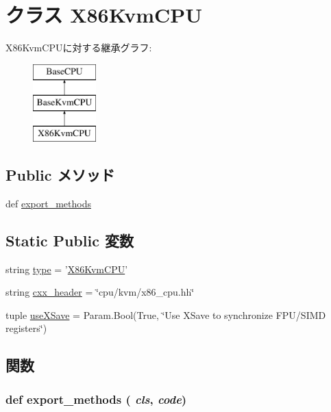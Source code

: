 \hypertarget{classX86KvmCPU_1_1X86KvmCPU}{
\section{クラス X86KvmCPU}
\label{classX86KvmCPU_1_1X86KvmCPU}
}
X86KvmCPUに対する継承グラフ:\begin{figure}[H]
\begin{center}
\leavevmode
\includegraphics[height=3cm]{classX86KvmCPU_1_1X86KvmCPU}
\end{center}
\end{figure}
\subsection*{Public メソッド}
\begin{DoxyCompactItemize}
\item 
def \hyperlink{classX86KvmCPU_1_1X86KvmCPU_ab373c5eaef9a7b80491a097389260f4a}{export\_\-methods}
\end{DoxyCompactItemize}
\subsection*{Static Public 変数}
\begin{DoxyCompactItemize}
\item 
string \hyperlink{classX86KvmCPU_1_1X86KvmCPU_acce15679d830831b0bbe8ebc2a60b2ca}{type} = '\hyperlink{classX86KvmCPU_1_1X86KvmCPU}{X86KvmCPU}'
\item 
string \hyperlink{classX86KvmCPU_1_1X86KvmCPU_a17da7064bc5c518791f0c891eff05fda}{cxx\_\-header} = \char`\"{}cpu/kvm/x86\_\-cpu.hh\char`\"{}
\item 
tuple \hyperlink{classX86KvmCPU_1_1X86KvmCPU_a3725b3e743931bddb52ab58aa1eabe2d}{useXSave} = Param.Bool(True, \char`\"{}Use XSave to synchronize FPU/SIMD registers\char`\"{})
\end{DoxyCompactItemize}


\subsection{関数}
\hypertarget{classX86KvmCPU_1_1X86KvmCPU_ab373c5eaef9a7b80491a097389260f4a}{
\subsubsection[{export\_\-methods}]{\setlength{\rightskip}{0pt plus 5cm}def export\_\-methods ( {\em cls}, \/   {\em code})}}
\label{classX86KvmCPU_1_1X86KvmCPU_ab373c5eaef9a7b80491a097389260f4a}



